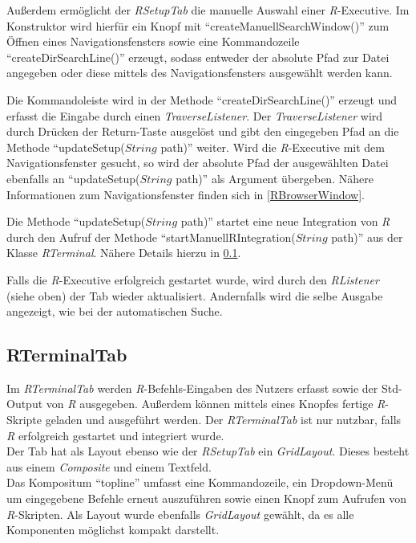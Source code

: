 \documentclass[a4paper, 12pt]{report} %
\begin{document}
Außerdem ermöglicht der \textit{RSetupTab} die manuelle Auswahl einer \textit{R}-Executive. Im Konstruktor wird hierfür ein Knopf mit "`createManuellSearchWindow()"' zum Öffnen eines Navigationsfensters sowie eine Kommandozeile "`createDirSearchLine()"' erzeugt, sodass entweder der absolute Pfad zur Datei angegeben oder diese mittels des Navigationsfensters ausgewählt werden kann.

Die Kommandoleiste wird in der Methode "`createDirSearchLine()"' erzeugt und erfasst die Eingabe durch einen \textit{TraverseListener}. Der \textit{TraverseListener} wird durch Drücken der Return-Taste ausgelöst und gibt den eingegeben Pfad an die Methode "`updateSetup($String$ path)"' weiter. Wird die \textit{R}-Executive mit dem Navigationsfenster gesucht, so wird der absolute Pfad der ausgewählten Datei ebenfalls an "`updateSetup($String$ path)"' als Argument übergeben. Nähere Informationen zum Navigationsfenster finden sich in \ref{RBrowserWindow}.

Die Methode "`updateSetup($String$ path)"' startet eine neue Integration von \textit{R} durch den Aufruf der Methode "`startManuellRIntegration($String$ path)"' aus der Klasse \textit{RTerminal}. Nähere Details hierzu in \ref{RTerminal}. 

Falls die \textit{R}-Executive erfolgreich gestartet wurde, wird durch den \textit{RListener} (siehe oben) der Tab wieder aktualisiert. Andernfalls wird die selbe Ausgabe angezeigt, wie bei der automatischen Suche.

\subsection{RTerminalTab} \label{RTerminal}

Im \textit{RTerminalTab} werden \textit{R}-Befehls-Eingaben des Nutzers erfasst sowie der Std-Output von \textit{R} ausgegeben. Außerdem können mittels eines Knopfes fertige \textit{R}-Skripte geladen und ausgeführt werden. Der \textit{RTerminalTab} ist nur nutzbar, falls \textit{R} erfolgreich gestartet und integriert wurde.\\

Der Tab hat als Layout ebenso wie der \textit{RSetupTab} ein \textit{GridLayout}.
Dieses besteht aus einem \textit{Composite} und einem Textfeld.\\

Das Kompositum "`topline"' umfasst eine Kommandozeile, ein Dropdown-Menü um eingegebene Befehle erneut auszuführen sowie einen Knopf zum Aufrufen von \textit{R}-Skripten. Als Layout wurde ebenfalls \textit{GridLayout} gewählt, da es alle Komponenten möglichst kompakt darstellt.
\end{document}
